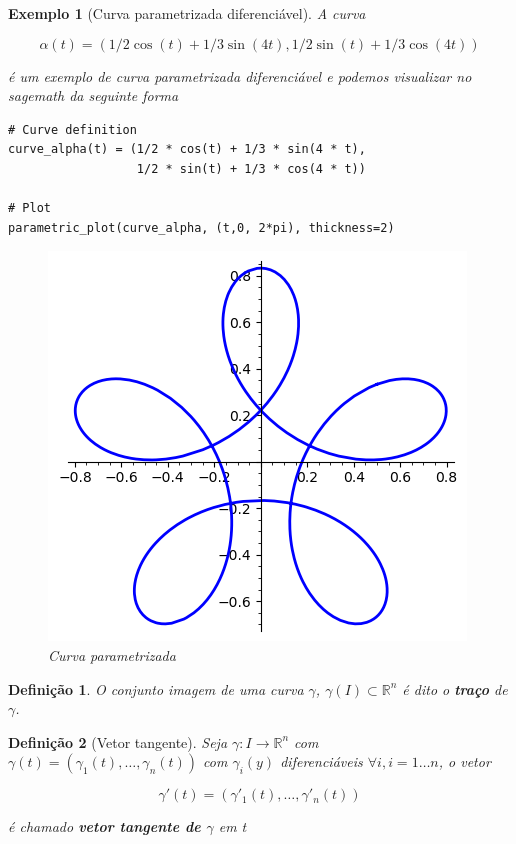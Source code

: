 \documentclass[12pt]{article}
\newtheorem{ex}{Exemplo}[section]
\newtheorem{definition}{Definição}
\begin{document}
\begin{ex}[Curva parametrizada diferenciável] A curva 

$$\alpha(t) = (1/2 \cos(t) + 1/3 \sin(4 t), 1/2 \sin(t) + 1/3 \cos(4 t))$$ 

é um exemplo de curva parametrizada diferenciável e podemos visualizar no \textit{sagemath} da seguinte forma
\begin{lstlisting}
# Curve definition
curve_alpha(t) = (1/2 * cos(t) + 1/3 * sin(4 * t), 
                  1/2 * sin(t) + 1/3 * cos(4 * t))

# Plot
parametric_plot(curve_alpha, (t,0, 2*pi), thickness=2)
\end{lstlisting}

\begin{figure}[H]
    \centering
    \includegraphics[scale=.6]{Images/ex1.1.png}
    \caption{Curva parametrizada}
    \label{fig:ex1.1}
\end{figure}
\end{ex}

\begin{definition}
O conjunto imagem de uma curva $\gamma$, $\gamma(I) \subset \mathbb{R}^n$ é dito o \textbf{traço} de $\gamma$.
\end{definition}

\begin{definition}[Vetor tangente]
Seja $\gamma: I \rightarrow \mathbb{R}^n$ com $\gamma(t) = (\gamma_1 (t), \ldots, \gamma_n (t))$ com $\gamma_i (y)$ diferenciáveis $\forall i, i = 1 \ldots n$, o vetor

$$\gamma'(t) = (\gamma'_1 (t), \ldots, \gamma'_n (t))$$

é chamado \textbf{vetor tangente de $\gamma$} em t
\end{definition}
\end{document}
